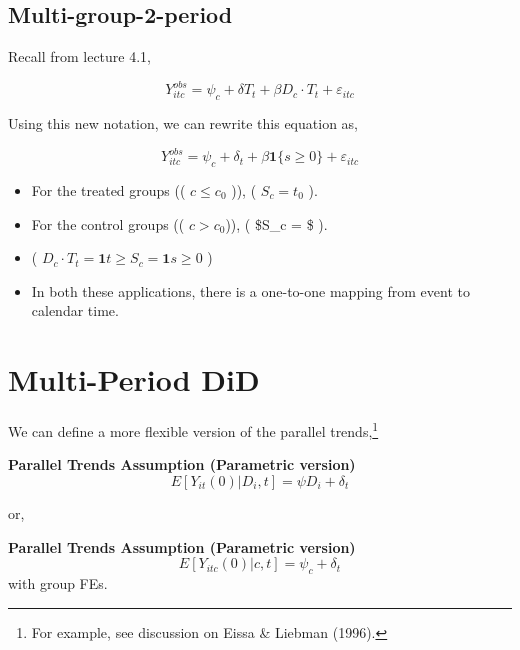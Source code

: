 \documentclass[
  letterpaper,
  DIV=11,
  numbers=noendperiod]{scrreprt}
\providecommand{\tightlist}{%
  \setlength{\itemsep}{0pt}\setlength{\parskip}{0pt}}\usepackage{longtable,booktabs,array}
\theoremstyle{definition}
\theoremstyle{remark}
\begin{document}
\hypertarget{multi-group-2-period-1}{%
\section{Multi-group-2-period}\label{multi-group-2-period-1}}

Recall from lecture 4.1,

\[
Y^{obs}_{itc} = \psi_c + \delta T_t + \beta D_c \cdot T_t + \varepsilon_{itc}
\]

Using this new notation, we can rewrite this equation as,

\[
Y^{obs}_{itc} = \psi_c + \delta_t + \beta \mathbf{1}\{s \geq 0\} + \varepsilon_{itc}
\]

\begin{itemize}
\tightlist
\item
  For the treated groups (( \(c \leq c_0\) )), ( \(S_c = t_0\) ).
\item
  For the control groups (( \(c > c_0\))), ( \$S\_c = \infty\$ ).
\item
  ( \(D_c \cdot T_t = \mathbf{1}{t \geq S_c} = \mathbf{1}{s \geq 0}\) )
\item
  In both these applications, there is a one-to-one mapping from event
  to calendar time.
\end{itemize}

\hypertarget{multi-period-did}{%
\chapter{Multi-Period DiD}\label{multi-period-did}}

We can define a more flexible version of the parallel trends,\footnote{For
  example, see discussion on Eissa \& Liebman (1996).}

\begin{tcolorbox}[enhanced jigsaw, breakable, colframe=quarto-callout-note-color-frame, toptitle=1mm, toprule=.15mm, opacitybacktitle=0.6, opacityback=0, rightrule=.15mm, titlerule=0mm, colback=white, bottomtitle=1mm, title={Note}, arc=.35mm, coltitle=black, colbacktitle=quarto-callout-note-color!10!white, leftrule=.75mm, bottomrule=.15mm, left=2mm]

\textbf{Parallel Trends Assumption (Parametric version)}\\
\[
E[Y_{it}(0)|D_i, t] = \psi D_i + \delta_t
\]

\end{tcolorbox}

or,

\begin{tcolorbox}[enhanced jigsaw, breakable, colframe=quarto-callout-note-color-frame, toptitle=1mm, toprule=.15mm, opacitybacktitle=0.6, opacityback=0, rightrule=.15mm, titlerule=0mm, colback=white, bottomtitle=1mm, title={Note}, arc=.35mm, coltitle=black, colbacktitle=quarto-callout-note-color!10!white, leftrule=.75mm, bottomrule=.15mm, left=2mm]

\textbf{Parallel Trends Assumption (Parametric version)}\\
\[
E[Y_{itc}(0)|c, t] = \psi_c + \delta_t
\] with group FEs.

\end{tcolorbox}
\end{document}
